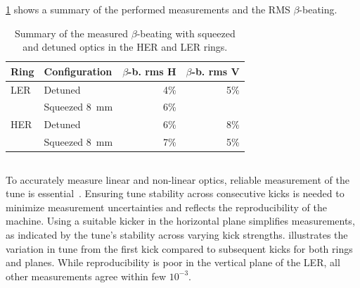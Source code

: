 \cref{tab:kek:summary_beating} shows a summary of the performed measurements and the RMS
$\beta$-beating.

\begin{table}
    \centering
    \begin{tabular}{llrr}
        \toprule
        Ring & Configuration & $\beta$-b. rms H & $\beta$-b. rms V \\
        \midrule
        LER  &  Detuned      & 4\%              & 5\%   \\
            &  Squeezed 8~mm & 6\%              &       \\
        HER  &  Detuned      & 6\%              & 8\%  \\
            &  Squeezed 8~mm & 7\%              & 5\%  \\
        \bottomrule
    \end{tabular}
    \caption{Summary of the measured $\beta$-beating with squeezed and detuned optics in the HER
    and LER rings.}
    \label{tab:kek:summary_beating}
\end{table}



\FloatBarrier
\subsection{}

\FloatBarrier
\subsubsection{}

To accurately measure linear and non-linear optics, reliable measurement of the tune is
essential~\cite{thrane_measuring_2020}. Ensuring tune stability across consecutive kicks is needed
to minimize measurement uncertainties and reflects the reproducibility of the machine. Using a
suitable kicker in the horizontal plane simplifies measurements, as indicated by the tune's 
stability across varying kick strengths.  illustrates the variation in tune
from the first kick compared to subsequent kicks for both rings and planes.
While reproducibility is poor in the vertical plane of the LER, all other measurements agree within
few $10^{-3}$.

